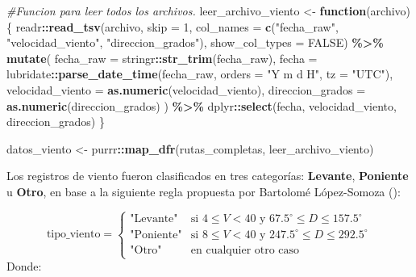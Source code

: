 \documentclass[
]{article}
\newenvironment{Shaded}{\begin{snugshade}}{\end{snugshade}}
\newcommand{\AttributeTok}[1]{\textcolor[rgb]{0.13,0.29,0.53}{#1}}
\newcommand{\CommentTok}[1]{\textcolor[rgb]{0.56,0.35,0.01}{\textit{#1}}}
\newcommand{\ConstantTok}[1]{\textcolor[rgb]{0.56,0.35,0.01}{#1}}
\newcommand{\ControlFlowTok}[1]{\textcolor[rgb]{0.13,0.29,0.53}{\textbf{#1}}}
\newcommand{\DecValTok}[1]{\textcolor[rgb]{0.00,0.00,0.81}{#1}}
\newcommand{\FunctionTok}[1]{\textcolor[rgb]{0.13,0.29,0.53}{\textbf{#1}}}
\newcommand{\NormalTok}[1]{#1}
\newcommand{\OtherTok}[1]{\textcolor[rgb]{0.56,0.35,0.01}{#1}}
\newcommand{\SpecialCharTok}[1]{\textcolor[rgb]{0.81,0.36,0.00}{\textbf{#1}}}
\newcommand{\StringTok}[1]{\textcolor[rgb]{0.31,0.60,0.02}{#1}}
\begin{document}
\begin{Shaded}
\begin{Highlighting}[]
\CommentTok{\#Funcion para leer todos los archivos.}
\NormalTok{leer\_archivo\_viento }\OtherTok{\textless{}{-}} \ControlFlowTok{function}\NormalTok{(archivo) \{}
\NormalTok{  readr}\SpecialCharTok{::}\FunctionTok{read\_tsv}\NormalTok{(archivo, }\AttributeTok{skip =} \DecValTok{1}\NormalTok{,}
                  \AttributeTok{col\_names =} \FunctionTok{c}\NormalTok{(}\StringTok{"fecha\_raw"}\NormalTok{, }
                                \StringTok{"velocidad\_viento"}\NormalTok{, }
                                \StringTok{"direccion\_grados"}\NormalTok{),}
                  \AttributeTok{show\_col\_types =} \ConstantTok{FALSE}\NormalTok{) }\SpecialCharTok{\%\textgreater{}\%}
    \FunctionTok{mutate}\NormalTok{(}
      \AttributeTok{fecha\_raw =}\NormalTok{ stringr}\SpecialCharTok{::}\FunctionTok{str\_trim}\NormalTok{(fecha\_raw),}
      \AttributeTok{fecha =}\NormalTok{ lubridate}\SpecialCharTok{::}\FunctionTok{parse\_date\_time}\NormalTok{(fecha\_raw, }\AttributeTok{orders =} \StringTok{"Y m d H"}\NormalTok{, }\AttributeTok{tz =} \StringTok{"UTC"}\NormalTok{),}
      \AttributeTok{velocidad\_viento =} \FunctionTok{as.numeric}\NormalTok{(velocidad\_viento),}
      \AttributeTok{direccion\_grados =} \FunctionTok{as.numeric}\NormalTok{(direccion\_grados)}
\NormalTok{    ) }\SpecialCharTok{\%\textgreater{}\%}
\NormalTok{    dplyr}\SpecialCharTok{::}\FunctionTok{select}\NormalTok{(fecha, velocidad\_viento, direccion\_grados)}
\NormalTok{\}}

\NormalTok{datos\_viento }\OtherTok{\textless{}{-}}\NormalTok{ purrr}\SpecialCharTok{::}\FunctionTok{map\_dfr}\NormalTok{(rutas\_completas, leer\_archivo\_viento)}
\end{Highlighting}
\end{Shaded}

Los registros de viento fueron clasificados en tres categorías: \textbf{Levante}, \textbf{Poniente} u \textbf{Otro}, en base a la siguiente regla propuesta por Bartolomé López-Somoza ():

\[
\text{tipo\_viento} =
\begin{cases}
\text{"Levante"} & \text{si } 4 \leq V < 40 \text{ y } 67.5^\circ \leq D \leq 157.5^\circ \\
\text{"Poniente"} & \text{si } 8 \leq V < 40 \text{ y } 247.5^\circ \leq D \leq 292.5^\circ \\
\text{"Otro"} & \text{en cualquier otro caso}
\end{cases}
\]
Donde:
\end{document}
